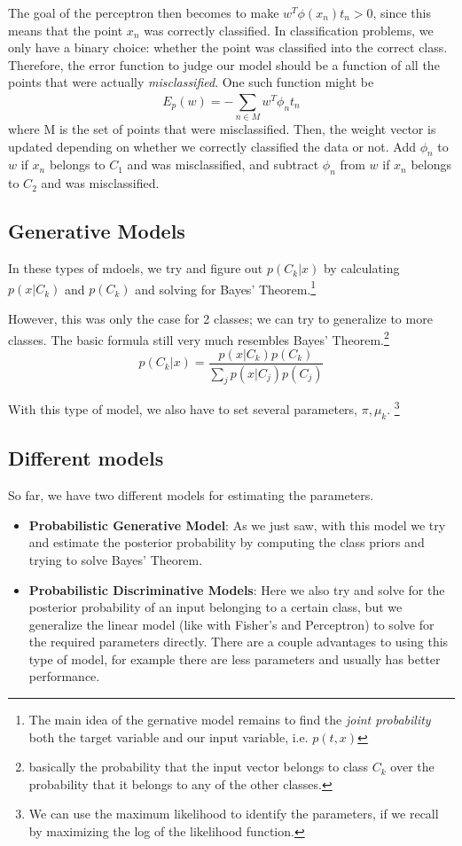 \documentclass{tufte-handout}
\begin{document}
	The goal of the perceptron then becomes to make $w^{T}\phi(x_{n})t_{n} > 0$, since this means
	that the point $x_{n}$ was correctly classified. In classification problems, we only have a binary
	choice: whether the point was classified into the correct class. Therefore, the error function to 
	judge our model should be a function of all the points that were actually \textit{misclassified}.
	One such function might be
	\[ E_{p}(w) = -\sum_{n\in M}^{}w^{T}\phi_{n}t_{n}\]
	where M is the set of points that were misclassified.
	Then, the weight vector is updated depending on whether we correctly classified the data or not.
	Add $\phi_{n}$ to $w$ if $x_{n}$ belongs to $C_{1}$ and was misclassified, and subtract $\phi_{n}$
	from $w$ if $x_{n}$ belongs to $C_{2}$ and was misclassified.
\subsection{Generative Models}
	In these types of mdoels, we try and figure out $p(C_{k}|x)$ by calculating $p(x|C_{k})$ and $p(C_{k})$
	and solving for Bayes' Theorem.\footnote{The main idea of the gernative model remains to find the 
	\textit{joint probability} both the target variable and our input variable, i.e. $p(t,x)$}

	However, this was only the case for 2 classes; we can try to generalize to more classes. The basic
	formula still very much resembles Bayes' Theorem.\footnote{basically the probability that the input
	vector belongs to class $C_{k}$ over the probability that it belongs to any of the other classes.}
	\[ p(C_{k}|x) = \frac{p(x|C_{k})p(C_{k})}{\sum_{j}^{}p(x|C_{j})p(C_{j})}\]

	With this type of model, we also have to set several parameters, $\pi, \mu_{k}$. \footnote{We can
	use the maximum likelihood to identify the parameters, if we recall by maximizing the log of the 
	likelihood function.}
\subsection{Different models}
	So far, we have two different models for estimating the parameters.
	\begin{itemize}
		\item \textbf{Probabilistic Generative Model}: As we just saw, with this model we try and
				estimate the posterior probability by computing the class priors and trying to 
				solve Bayes' Theorem.
		\item \textbf{Probabilistic Discriminative Models}: Here we also try and solve for the 
				posterior probability of an input belonging to a certain class, but we 
				generalize the linear model (like with Fisher's and Perceptron) to solve for the 
				required parameters directly. There are a couple advantages to using this type
				of model, for example there are less parameters and usually has better performance.
	\end{itemize}
\end{document}
